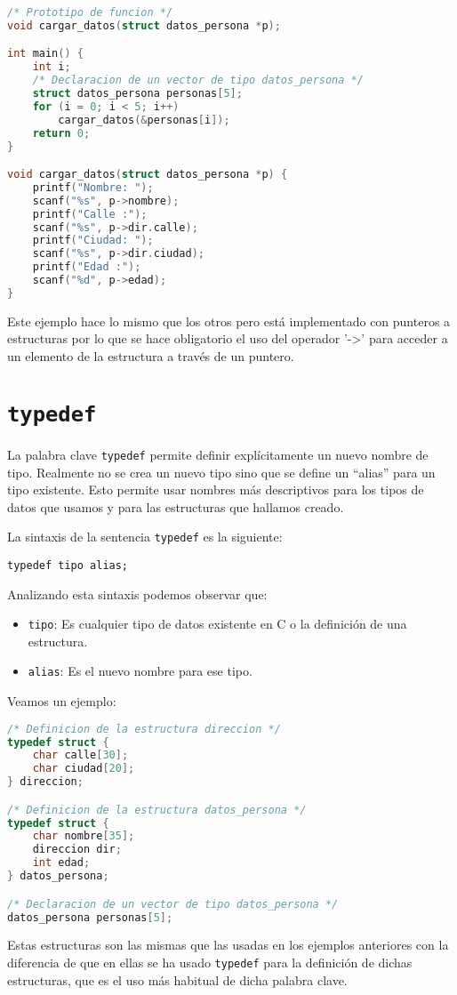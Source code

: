 {\begin{Ejemplo}
\begin{lstlisting}[language=C]
/* Prototipo de funcion */
void cargar_datos(struct datos_persona *p);

int main() {
    int i;
    /* Declaracion de un vector de tipo datos_persona */
    struct datos_persona personas[5];
    for (i = 0; i < 5; i++)
        cargar_datos(&personas[i]);
    return 0;
}

void cargar_datos(struct datos_persona *p) {
    printf("Nombre: ");
    scanf("%s", p->nombre);
    printf("Calle :");
    scanf("%s", p->dir.calle);
    printf("Ciudad: ");
    scanf("%s", p->dir.ciudad);
    printf("Edad :");
    scanf("%d", p->edad);
}
\end{lstlisting}
\Explicacion
Este ejemplo hace lo mismo que los otros pero está implementado con punteros a estructuras por lo que se hace obligatorio el uso del operador '->' para acceder a un elemento de la estructura a través de un puntero.
\end{Ejemplo}
}

\section{\texttt{typedef}}
La palabra clave \texttt{typedef} permite definir explícitamente un nuevo nombre de tipo. Realmente no se crea un nuevo tipo sino que se define un ``alias'' para un tipo existente. Esto permite usar nombres más descriptivos para los tipos de datos que usamos y para las estructuras que hallamos creado.

La sintaxis de la sentencia \texttt{typedef} es la siguiente:

\texttt{typedef tipo alias;}

Analizando esta sintaxis podemos observar que:
\begin{itemize}
	\item \texttt{tipo}: Es cualquier tipo de datos existente en C o la definición de una estructura.
	\item \texttt{alias}: Es el nuevo nombre para ese tipo.
\end{itemize}
Veamos un ejemplo:
\begin{Ejemplo}
\begin{lstlisting}[language=C]
/* Definicion de la estructura direccion */
typedef struct {
    char calle[30];
    char ciudad[20];
} direccion;

/* Definicion de la estructura datos_persona */
typedef struct {
    char nombre[35];
    direccion dir;
    int edad;
} datos_persona;

/* Declaracion de un vector de tipo datos_persona */
datos_persona personas[5];
\end{lstlisting}
\Explicacion
Estas estructuras son las mismas que las usadas en los ejemplos anteriores con la diferencia de que en ellas se ha usado \texttt{typedef} para la definición de dichas estructuras, que es el uso más habitual de dicha palabra clave.
\end{Ejemplo}